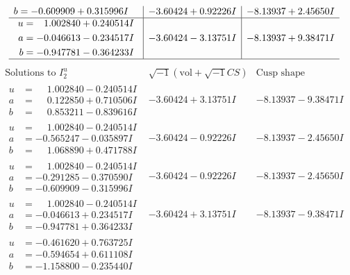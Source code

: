 \documentclass[1p]{elsarticle_modified}
\theoremstyle{definition}
\newcommand{\I}{\sqrt{-1}}
\begin{document}
$$\begin{array}{c|c|c}
\begin{aligned}
b &= -0.609909 + 0.315996 I\end{aligned}
 & -3.60424 + 0.92226 I & -8.13937 + 2.45650 I \\ \hline\begin{aligned}
u &= \phantom{-}1.002840 + 0.240514 I \\
a &= -0.046613 - 0.234517 I \\
b &= -0.947781 - 0.364233 I\end{aligned}
 & -3.60424 - 3.13751 I & -8.13937 + 9.38471 I\\
 \hline 
 \end{array}$$\newpage$$\begin{array}{c|c|c}  
\text{Solutions to }I^u_{2}& \I (\text{vol} + \sqrt{-1}CS) & \text{Cusp shape}\\
 \hline 
\begin{aligned}
u &= \phantom{-}1.002840 - 0.240514 I \\
a &= \phantom{-}0.122850 + 0.710506 I \\
b &= \phantom{-}0.853211 - 0.839616 I\end{aligned}
 & -3.60424 + 3.13751 I & -8.13937 - 9.38471 I \\ \hline\begin{aligned}
u &= \phantom{-}1.002840 - 0.240514 I \\
a &= -0.565247 - 0.035897 I \\
b &= \phantom{-}1.068890 + 0.471788 I\end{aligned}
 & -3.60424 - 0.92226 I & -8.13937 - 2.45650 I \\ \hline\begin{aligned}
u &= \phantom{-}1.002840 - 0.240514 I \\
a &= -0.291285 - 0.370590 I \\
b &= -0.609909 - 0.315996 I\end{aligned}
 & -3.60424 - 0.92226 I & -8.13937 - 2.45650 I \\ \hline\begin{aligned}
u &= \phantom{-}1.002840 - 0.240514 I \\
a &= -0.046613 + 0.234517 I \\
b &= -0.947781 + 0.364233 I\end{aligned}
 & -3.60424 + 3.13751 I & -8.13937 - 9.38471 I \\ \hline\begin{aligned}
u &= -0.461620 + 0.763725 I \\
a &= -0.594654 + 0.611108 I \\
b &= -1.158800 - 0.235440 I\end{aligned}

\end{array}$$
\end{document}
